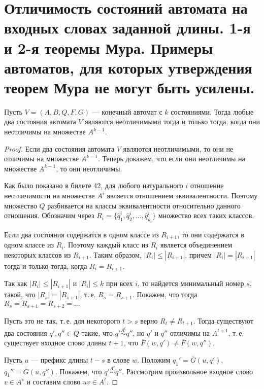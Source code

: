 \section{Отличимость состояний автомата на входных словах заданной длины. 1-я и 2-я теоремы Мура. Примеры автоматов, для которых утверждения теорем Мура не могут быть усилены.}

\begin{theorem}
    Пусть $V=(A, B, Q, F, G)$ --- конечный автомат с $k$ состояниями. Тогда любые два состояния автомата $V$ являются неотличимыми тогда и только тогда, когда они неотличимы на множестве $A^{k-1}$.
\end{theorem}

\begin{proof}
    Если два состояния автомата $V$ являются неотличимыми, то они не отличимы на множестве $A^{k-1}$. Теперь докажем, что если они неотличимы на множестве $A^{k-1}$, то они неотличимы.

    Как было показано в билете 42, для любого натурального $i$ отношение неотличимости на множестве $A^i$ является отношением эквивалентности. Поэтому множество $Q$ разбивается на классы эквивалентности относительно данного отношения. Обозначим через $R_i = \{\hat{q}^i_1, \hat{q}^i_2, \ldots, \hat{q}^i_{k_i}\}$ множество всех таких классов.

    Если два состояния содержатся в одном классе из $R_{i+1}$, то они содержатся в одном классе из $R_i$. Поэтому каждый класс из $R_i$ является объединением некоторых классов из $R_{i+1}$. Таким образом, $|R_i| \leqslant |R_{i+1}|$, причем $|R_i| = |R_{i+1}|$ тогда и только тогда, когда $R_i = R_{i+1}$.

    Так как $|R_i| \leqslant |R_{i+1}|$ и $|R_i| \leqslant k$ при всех $i$, то найдется минимальный номер $s$, такой, что $|R_s| = |R_{s+1}|$, т.\,е. $R_s = R_{s+1}$. Покажем, что тогда $R_s = R_{s+1} = R_{s+2} = \ldots$

    Пусть это не так, т.\,е. для некоторого $t > s$ верно $R_t \neq R_{t+1}$.
    Тогда существуют два состояния $q',q'' \in Q$ такие, что $q'\stackrel{A^t}{\sim} q''$, но $q'$ и $q''$ отличимы на $A^{t+1}$, т.\,е. существует входное слово длины $t+1$, что $\overline{F}(w, q') \neq \overline{F}(w, q'')$.
    
    Пусть $u$ --- префикс длины $t-s$ в слове $w$. Положим $q_1'= \overline{G}(u, q')$, $q_1''=\overline{G}(u, q'')$. Покажем, что $q'\stackrel{A^s}{\sim} q''$. Рассмотрим произвольное входное слово $v \in A^s$ и составим слово $uv \in A^t$.


\end{proof}
